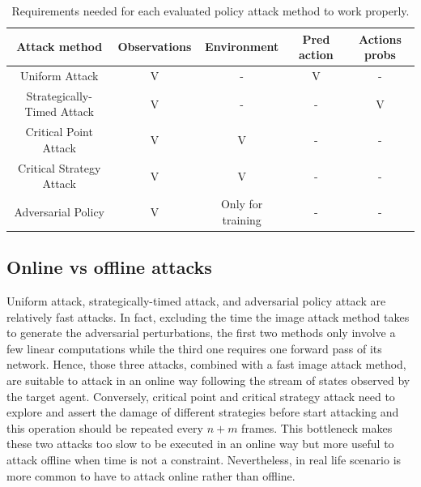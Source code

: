 \begin{table}
  \centering
  \caption{Requirements needed for each evaluated policy attack method to work properly.}
  \begin{tabular}{ccccc}
    \toprule
    Attack method & Observations & Environment & Pred action & Actions probs              \\
    \midrule
     Uniform Attack & V & - & V & - \\ 
 Strategically-Timed Attack & V & - & - & V \\
 Critical Point Attack & V & V & - & - \\
 Critical Strategy Attack & V & V & - & - \\
 Adversarial Policy & V & Only for training & - & - \\
    \bottomrule
  \end{tabular}
  \label{table:atk_req}
\end{table}

\subsection{Online vs offline attacks}
Uniform attack, strategically-timed attack, and adversarial policy attack are relatively fast attacks. In fact, excluding the time the image attack method takes to generate the adversarial perturbations, the first two methods only involve a few linear computations while the third one requires one forward pass of its network. Hence, those three attacks, combined with a fast image attack method, are suitable to attack in an online way following the stream of states observed by the target agent. Conversely, critical point and critical strategy attack need to explore and assert the damage of different strategies before start attacking and this operation should be repeated every \(n+m\) frames. This bottleneck makes these two attacks too slow to be executed in an online way but more useful to attack offline when time is not a constraint. Nevertheless, in real life scenario is more common to have to attack online rather than offline.